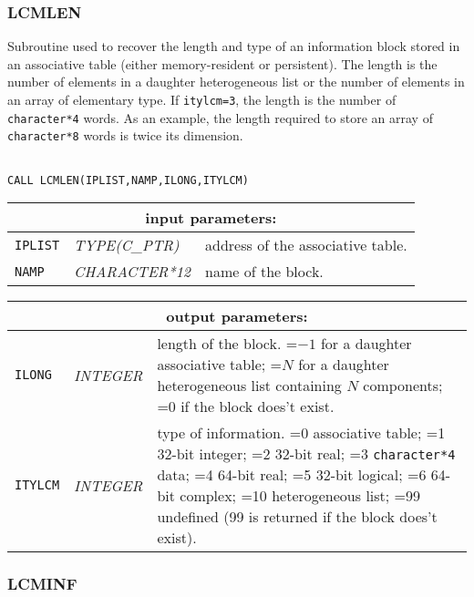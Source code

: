 \subsubsection{LCMLEN}

Subroutine used to recover the length and type of an information block stored in an
associative table (either memory-resident or persistent). The length is the number of
elements in a daughter heterogeneous list or the number of elements in an array of elementary type.
If {\tt itylcm=3}, the length is the number of {\tt character*4} words. As an example, the length required
to store an array of {\tt character*8} words is twice its dimension.

\begin{verbatim}

CALL LCMLEN(IPLIST,NAMP,ILONG,ITYLCM)
\end{verbatim}

\noindent
\begin{tabular}{|p{1.5cm}|p{3cm}|p{10cm}|}
\hline
\multicolumn{3}{|c|}{\bf input parameters:} \\
\hline
{\tt IPLIST} & {\it TYPE(C\_PTR)} & address of the associative table. \\
\hline
{\tt NAMP} & {\it CHARACTER*12} & name of the block. \\
\hline
\end{tabular}

\vskip 0.8cm

\noindent
\begin{tabular}{|p{1.5cm}|p{3cm}|p{10cm}|}
\hline
\multicolumn{3}{|c|}{\bf output parameters:} \\
\hline
{\tt ILONG} & {\it INTEGER} & length of the block. =$-1$ for a daughter associative table; 
                                    =$N$ for a daughter heterogeneous list containing $N$ components; 
		                 =0 if the block does't exist.\\
\hline
{\tt ITYLCM} & {\it INTEGER} & type of information. =0 associative table; =1 32-bit integer; 
                                    =2 32-bit real; =3 {\tt character*4} data; 
				    =4 64-bit real; =5 32-bit logical; =6 64-bit complex; =10 heterogeneous list; 
				    =99 undefined (99 is returned if the block does't exist). \\
\hline
\end{tabular}

\subsubsection{LCMINF}

